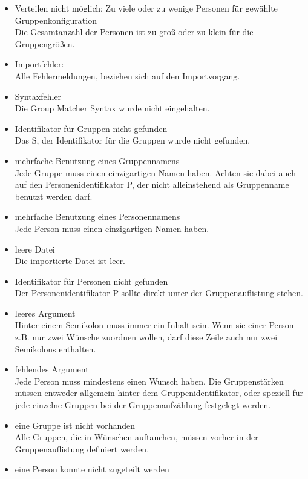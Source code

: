 \documentclass[a4paper,11pt]{article}
\begin{document}
\begin{itemize}
    \item Verteilen nicht möglich: Zu viele oder zu wenige Personen für gewählte Gruppenkonfiguration \\
    Die Gesamtanzahl der Personen ist zu groß oder zu klein für die Gruppengrößen.
    \item Importfehler: \\
    Alle Fehlermeldungen, beziehen sich auf den Importvorgang.
    \item Syntaxfehler \\
    Die Group Matcher Syntax wurde nicht eingehalten.
    \item Identifikator für Gruppen nicht gefunden \\
    Das S, der Identifikator für die Gruppen wurde nicht gefunden.
    \item mehrfache Benutzung eines Gruppennamens \\
    Jede Gruppe muss einen einzigartigen Namen haben. Achten sie dabei auch auf den Personenidentifikator P, der nicht alleinstehend als Gruppenname benutzt werden darf.
    \item mehrfache Benutzung eines Personennamens \\
    Jede Person muss einen einzigartigen Namen haben.
    \item leere Datei \\
    Die importierte Datei ist leer.
    \item Identifikator für Personen nicht gefunden \\
    Der Personenidentifikator P sollte direkt unter der Gruppenauflistung stehen.
    \item leeres Argument \\
    Hinter einem Semikolon muss immer ein Inhalt sein. Wenn sie einer Person z.B. nur zwei Wünsche zuordnen wollen, darf diese Zeile auch nur zwei Semikolons enthalten.
    \item fehlendes Argument \\
    Jede Person muss mindestens einen Wunsch haben. Die Gruppenstärken müssen entweder allgemein hinter dem Gruppenidentifikator, oder speziell für jede einzelne Gruppen bei der Gruppenaufzählung festgelegt werden.
    \item eine Gruppe ist nicht vorhanden \\
    Alle Gruppen, die in Wünschen auftauchen, müssen vorher in der Gruppenauflistung definiert werden.
    \item eine Person konnte nicht zugeteilt werden \\

\end{itemize}
\end{document}
